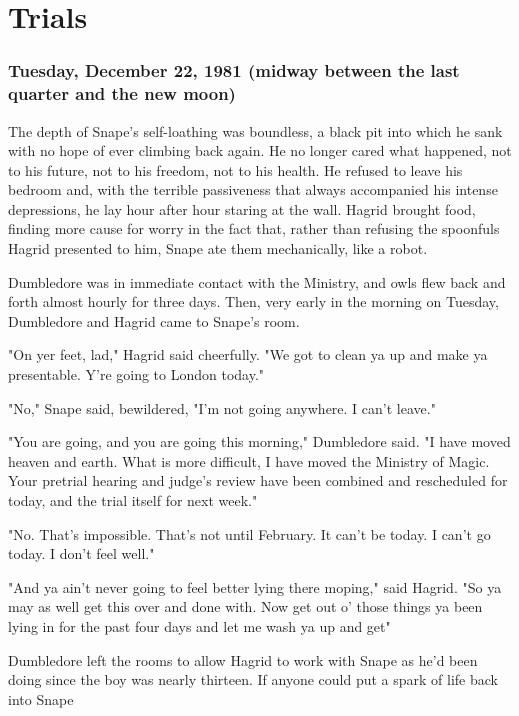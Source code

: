 
\chapter{Trials}

\subsection{Tuesday, December 22, 1981 (midway between the last quarter and the new moon)}

The depth of Snape's self-loathing was boundless, a black pit into which he sank with no hope of ever climbing back again. He no longer cared what happened, not to his future, not to his freedom, not to his health. He refused to leave his bedroom and, with the terrible passiveness that always accompanied his intense depressions, he lay hour after hour staring at the wall. Hagrid brought food, finding more cause for worry in the fact that, rather than refusing the spoonfuls Hagrid presented to him, Snape ate them mechanically, like a robot.

Dumbledore was in immediate contact with the Ministry, and owls flew back and forth almost hourly for three days. Then, very early in the morning on Tuesday, Dumbledore and Hagrid came to Snape's room.

"On yer feet, lad," Hagrid said cheerfully. "We got to clean ya up and make ya presentable. Y're going to London today."

"No," Snape said, bewildered, "I'm not going anywhere. I can't leave."

"You are going, and you are going this morning," Dumbledore said. "I have moved heaven and earth. What is more difficult, I have moved the Ministry of Magic. Your pretrial hearing and judge's review have been combined and rescheduled for today, and the trial itself for next week."

"No. That's impossible. That's not until February. It can't be today. I can't go today. I don't feel well."

"And ya ain't never going to feel better lying there moping," said Hagrid. "So ya may as well get this over and done with. Now get out o' those things ya been lying in for the past four days and let me wash ya up and get{\el}"

Dumbledore left the rooms to allow Hagrid to work with Snape as he'd been doing since the boy was nearly thirteen. If anyone could put a spark of life back into Snape{\el}

